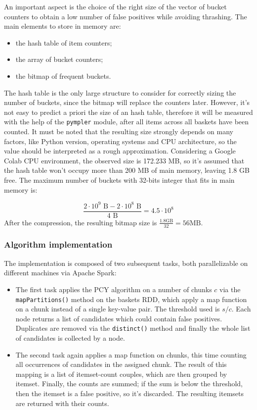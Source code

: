 \documentclass{article}
\begin{document}
An important aspect is the choice of the right size of the vector of bucket counters to obtain a low number of false positives while avoiding thrashing.
The main elements to store in memory are:
\begin{itemize}
	\item the hash table of item counters;
	\item the array of bucket counters;
	\item the bitmap of frequent buckets.
\end{itemize}
The hash table is the only large structure to consider for correctly sizing the number of buckets, since the bitmap will replace the counters later.
However, it's not easy to predict a priori the size of an hash table, therefore it will be measured with the help of the \texttt{pympler} module, after all items across all baskets have been counted. It must be noted that the resulting size strongly depends on many factors, like Python version, operating systems and CPU architecture, so the value should be interpreted as a rough approximation. Considering a Google Colab CPU environment, the observed size is 172.233 MB, so it's assumed that the hash table won't occupy more than 200 MB of main memory, leaving 1.8 GB free. The maximum number of buckets with 32-bits integer that fits in main memory is:

\begin{equation}
	\frac{2 \cdot 10^9 \text{ B} - 2 \cdot 10^8 \text{ B}}{4 \text{ B}} = 4.5 \cdot 10^8
\end{equation}
After the compression, the resulting bitmap size is $\frac{1.8 \text{GB} }{32} = 56 \text{MB}$.

\subsubsection{Algorithm implementation}

The implementation is composed of two subsequent tasks, both parallelizable on different machines via Apache Spark:
\begin{itemize}
	\item The first task applies the PCY algorithm on a number of chunks $c$ via the \texttt{mapPartitions()} method on the baskets RDD, which apply a map function on a chunk instead of a single key-value pair. The threshold used is $s/c$. Each node returns a list of candidates which could contain false positives. Duplicates are removed via the \texttt{distinct()} method and finally the whole list of candidates is collected by a node.
	\item The second task again applies a map function on chunks, this time counting all occurrences of candidates in the assigned chunk. The result of this mapping is a list of itemset-count couples, which are then grouped by itemset. Finally, the counts are summed; if the sum is below the threshold, then the itemset is a false positive, so it's discarded. The resulting itemsets are returned with their counts.
\end{itemize}
\end{document}
